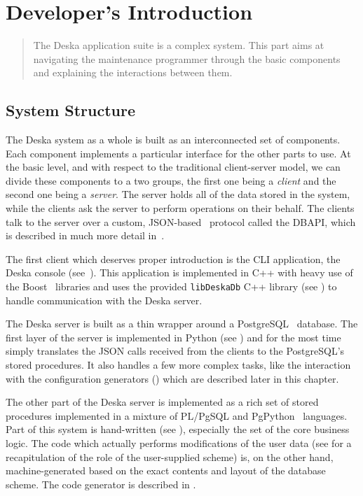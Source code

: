 \documentclass[deska]{subfiles}
\begin{document}
\chapter{Developer's Introduction}
\label{sec:dev-intro}

\begin{abstract}
The Deska application suite is a complex system.  This part aims at navigating the maintenance programmer through the
basic components and explaining the interactions between them.
\end{abstract}

\section{System Structure}
The Deska system as a whole is built as an interconnected set of components.  Each component implements a particular
interface for the other parts to use.  At the basic level, and with respect to the traditional client-server model, we
can divide these components to a two groups, the first one being a {\em client} and the second one being a {\em server}.
The server holds all of the data stored in the system, while the clients ask the server to perform operations on their
behalf.  The clients talk to the server over a custom, JSON-based~\cite{json} protocol called the DBAPI, which is
described in much more detail in~.

The first client which deserves proper introduction is the CLI application, the Deska console
(see~).  This application is implemented in C++ with heavy use of the Boost~\cite{boost} libraries
and uses the provided {\tt libDeskaDb} C++ library (see ) to handle communication with the Deska
server.

The Deska server is built as a thin wrapper around a PostgreSQL~\cite{postgresql} database.  The first layer of the
server is implemented in Python (see ) and for the most time simply translates the JSON calls
received from the clients to the PostgreSQL's stored procedures.  It also handles a few more complex tasks, like the
interaction with the configuration generators () which are described later in this
chapter.

The other part of the Deska server is implemented as a rich set of stored procedures implemented in a mixture of
PL/PgSQL and PgPython~\cite{pg-python} languages.  Part of this system is hand-written (see ),
especially the set of the core business logic.  The code which actually performs modifications of the user data (see
 for a recapitulation of the role of the user-supplied scheme) is, on the other hand,
machine-generated based on the exact contents and layout of the database scheme.  The code generator is described in
.
\end{document}
